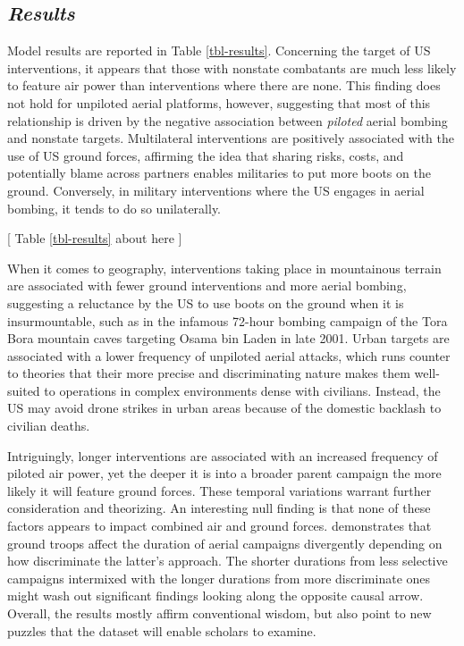 \documentclass[fleqn,12pt]{article}
\begin{document}
\subsection*{\textit{Results}}
Model results are reported in Table \ref{tbl-results}. Concerning the target of US interventions, it appears that those with nonstate combatants are much less likely to feature air power than interventions where there are none. This finding does not hold for unpiloted aerial platforms, however, suggesting that most of this relationship is driven by the negative association between \textit{piloted} aerial bombing and nonstate targets. Multilateral interventions are positively associated with the use of US ground forces, affirming the idea that sharing risks, costs, and potentially blame across partners enables militaries to put more boots on the ground. Conversely, in military interventions where the US engages in aerial bombing, it tends to do so unilaterally.

\begin{center}
	[ Table \ref{tbl-results} about here ]
\end{center}

When it comes to geography, interventions taking place in mountainous terrain are associated with fewer ground interventions and more aerial bombing, suggesting a reluctance by the US to use boots on the ground when it is insurmountable, such as in the infamous 72-hour bombing campaign of the Tora Bora mountain caves targeting Osama bin Laden in late 2001. Urban targets are associated with a lower frequency of unpiloted aerial attacks, which runs counter to theories that their more precise and discriminating nature makes them well-suited to operations in complex environments dense with civilians. Instead, the US may avoid drone strikes in urban areas because of the domestic backlash to civilian deaths.

Intriguingly, longer interventions are associated with an increased frequency of piloted air power, yet the deeper it is into a broader parent campaign the more likely it will feature ground forces. These temporal variations warrant further consideration and theorizing. An interesting null finding is that none of these factors appears to impact combined air and ground forces. \citet{MM15} demonstrates that ground troops affect the duration of aerial campaigns divergently depending on how discriminate the latter's approach. The shorter durations from less selective campaigns intermixed with the longer durations from more discriminate ones might wash out significant findings looking along the opposite causal arrow. Overall, the results mostly affirm conventional wisdom, but also point to new puzzles that the dataset will enable scholars to examine.
\end{document}
